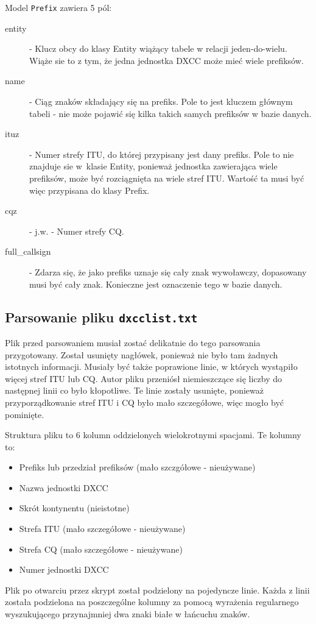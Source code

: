\documentclass[]{mgr}
\begin{document}
            \clearpage
            \noindent Model \texttt{Prefix} zawiera 5 pól:
            \begin{description}
                \item[entity] - Klucz obcy do klasy Entity wiążący tabele w relacji jeden-do-wielu. Wiąże sie to z tym, że jedna jednostka DXCC może mieć wiele prefiksów.
                \item[name] - Ciąg znaków składający się na prefiks. Pole to jest kluczem głównym tabeli - nie może pojawić się kilka takich samych prefiksów w bazie danych.
                \item[ituz] - Numer strefy ITU, do której przypisany jest dany prefiks. Pole to nie znajduje sie w~klasie Entity, ponieważ jednostka zawierająca wiele prefiksów, może być rozciągnięta na wiele stref ITU. Wartość ta musi być więc przypisana do klasy Prefix.
                \item[cqz] - j.w. - Numer strefy CQ.
                \item[full\_callsign] - Zdarza się, że jako prefiks uznaje się cały znak wywoławczy, dopasowany musi być cały znak. Konieczne jest oznaczenie tego w bazie danych.
            \end{description}

            \subsection{Parsowanie pliku \texttt{dxcclist.txt}}
            Plik przed parsowaniem musiał zostać delikatnie do tego parsowania przygotowany. Został usunięty nagłówek, ponieważ nie było tam żadnych istotnych informacji. Musiały być także poprawione linie, w których wystąpiło więcej stref ITU lub CQ. Autor pliku przeniósł niemieszczące się liczby do następnej linii co było kłopotliwe. Te linie zostały usunięte, ponieważ przyporządkowanie stref ITU i CQ było mało szczegółowe, więc mogło być pominięte.

            

            Struktura pliku to 6 kolumn oddzielonych wielokrotnymi spacjami. Te kolumny to:
            \begin{itemize}
                \item Prefiks lub przedział prefiksów (mało szczgółowe - nieużywane)
                \item Nazwa jednostki DXCC
                \item Skrót kontynentu (nieistotne)
                \item Strefa ITU (mało szczegółowe - nieużywane)
                \item Strefa CQ (mało szczegółowe - nieużywane)
                \item Numer jednostki DXCC
            \end{itemize}
            Plik po otwarciu przez skrypt został podzielony na pojedyncze linie. Każda z linii została podzielona na poszczególne kolumny za pomocą wyrażenia regularnego wyszukującego przynajmniej dwa znaki białe w łańcuchu znaków.
\end{document}
